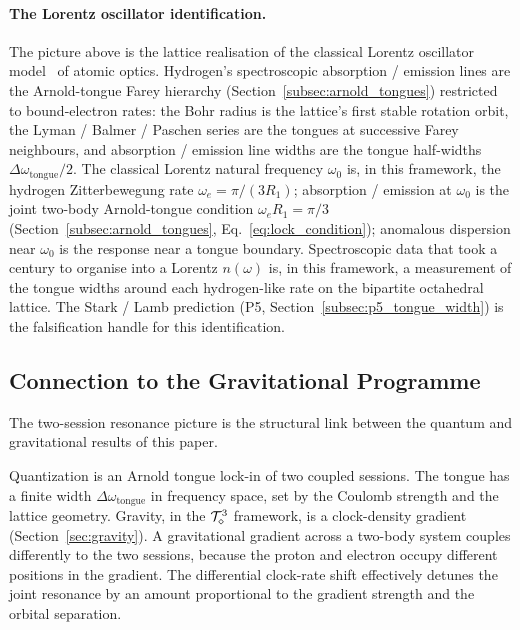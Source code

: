 \paragraph{The Lorentz oscillator identification.}
The picture above is the lattice realisation of the classical Lorentz
oscillator model~\cite{lorentz1909} of atomic optics.  Hydrogen's
spectroscopic
absorption / emission lines are the Arnold-tongue Farey hierarchy
(Section~\ref{subsec:arnold_tongues}) restricted to bound-electron
rates: the Bohr radius is the lattice's first stable rotation orbit,
the Lyman / Balmer / Paschen series are the tongues at successive
Farey neighbours, and absorption / emission line widths are the
tongue half-widths $\Delta\omega_\text{tongue}/2$.  The classical
Lorentz natural frequency $\omega_0$ is, in this framework, the
hydrogen Zitterbewegung rate $\omega_e = \pi/(3R_1)$; absorption /
emission at $\omega_0$ is the joint two-body Arnold-tongue
condition $\omega_e R_1 = \pi/3$ (Section~\ref{subsec:arnold_tongues},
Eq.~\ref{eq:lock_condition}); anomalous dispersion near $\omega_0$
is the response near a tongue boundary.  Spectroscopic data that
took a century to organise into a Lorentz $n(\omega)$ is, in this
framework, a measurement of the tongue widths around each
hydrogen-like rate on the bipartite octahedral lattice.  The
Stark / Lamb prediction (P5,
Section~\ref{subsec:p5_tongue_width}) is the falsification handle
for this identification.

\subsection{Connection to the Gravitational Programme}
\label{subsec:hydrogen_gravity_link}

The two-session resonance picture is the structural link between the
quantum and gravitational results of this paper.

Quantization is an Arnold tongue lock-in of two coupled sessions.
The tongue has a finite width $\Delta\omega_\text{tongue}$ in frequency
space, set by the Coulomb strength and the lattice geometry.
Gravity, in the $\mathcal{T}_\diamond^3$ framework, is a clock-density gradient
(Section~\ref{sec:gravity}).
A gravitational gradient across a two-body system couples differently
to the two sessions, because the proton and electron occupy different
positions in the gradient.
The differential clock-rate shift effectively detunes the joint resonance
by an amount proportional to the gradient strength and the orbital
separation.

